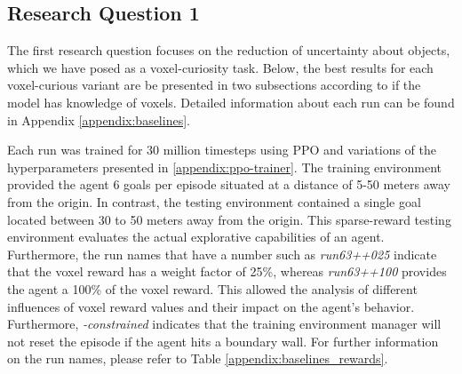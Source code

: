 
\subsection{Research Question 1}\label{chap:4:results-RQ1}

The first research question focuses on the reduction of uncertainty about objects, which we have posed as a voxel-curiosity task. Below, the best results for each voxel-curious variant are be presented in two subsections according to if the model has knowledge of voxels. Detailed information about each run can be found in Appendix \ref{appendix:baselines}.

Each run was trained for 30 million timesteps using PPO and variations of the hyperparameters presented in \ref{appendix:ppo-trainer}. The training environment provided the agent 6 goals per episode situated at a distance of 5-50 meters away from the origin. In contrast, the testing environment contained a single goal located between 30 to 50 meters away from the origin. This sparse-reward testing environment evaluates the actual explorative capabilities of an agent.
Furthermore, the run names that have a number such as \textit{run63++025} indicate that the voxel reward has a weight factor of 25\%, whereas \textit{run63++100} provides the agent a 100\% of the voxel reward. This allowed the analysis of different influences of voxel reward values and their impact on the agent's behavior. Furthermore, \textit{-constrained} indicates that the training environment manager will not reset the episode if the agent hits a boundary wall. For further information on the run names, please refer to Table \ref{appendix:baselines_rewards}.

\newpage


